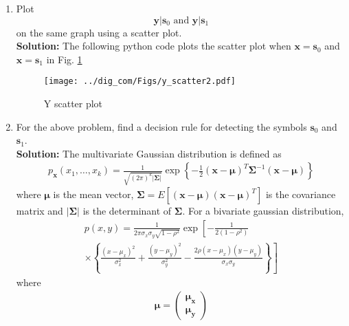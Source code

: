 \documentclass{article}
\numberwithin{equation}{subsection}
\numberwithin{figure}{subsection}
\providecommand{\mbf}{\mathbf}
\providecommand{\cbrak}[1]{\ensuremath{\left\{#1\right\}}}
\providecommand{\brak}[1]{\ensuremath{\left(#1\right)}}
\providecommand{\lsbrak}[1]{\ensuremath{{}\left[#1\right.}}
\providecommand{\rsbrak}[1]{\ensuremath{{}\left.#1\right]}}
\providecommand{\sbrak}[1]{\ensuremath{{}\left[#1\right]}}
\providecommand{\abs}[1]{\left\vert#1\right\vert}
\newcommand{\solution}{\noindent \textbf{Solution: }}
\renewcommand\thesection{\arabic{section}}
\renewcommand\thesubsection{\thesection.\arabic{subsection}}
\begin{document}
\begin{enumerate}[label=\thesubsection.\arabic*,ref=\thesubsection.\arabic{figure}]
\item
\label{ch5_fsk}
Plot 
%
\begin{equation}
\mbf{y}|\mbf{s}_0 \text{ and } \mbf{y}|\mbf{s}_1
\end{equation}
%
on the same graph using a scatter plot.\\
\solution The following python code plots the scatter plot when $\mbf{x} = \mbf{s}_0$ and $\mbf{x} = \mbf{s}_1$ in Fig. \ref{fig:scatter_2}
\begin{center}
\end{center}
\begin{figure}
\centering
\texttt{[image: ../dig\_com/Figs/y\_scatter2.pdf]}     
\caption{Y scatter plot }
\label{fig:scatter_2}
\end{figure}
\item
For the above problem, find a decision rule for detecting the symbols $\mbf{s}_0 $ and $\mbf{s}_1$.\\
\solution The multivariate Gaussian distribution is defined as
    \begin{multline}
    \label{eq:multivariate}
    p_{\mathbf{x}}(x_1,\dots,x_k)
    =\frac{1}{\sqrt{\brak{2\pi}^k\abs{\mbf{\Sigma}}}}\exp\cbrak{-\frac{1}{2}\brak{\mathbf{x}-\mbf{\mu}}^T\mbf{\Sigma}^{-1}\brak{\mathbf{x}-\mbf{\mu}}}
    \end{multline}
    where $\mbf{\mu}$ is the mean vector, $\mbf{\Sigma} = E\sbrak{\brak{\mathbf{x}-\mbf{\mu}}\brak{\mathbf{x}-\mbf{\mu}}^T}$ is the covariance matrix and $\abs{\mbf{\Sigma}}$ is the determinant of $\mbf{\Sigma}$.
    For a bivariate gaussian distribution,
    {\small
    \begin{multline}
    \label{eq:bivariate}
    p(x,y)= \frac{1}{2\pi \sigma_x\sigma_y\sqrt{1-\rho^2}}\exp\lsbrak{-\frac{1}{2\brak{1-\rho^2}}}
    \\
    \times \rsbrak{\cbrak{\frac{\brak{x-\mu_x}^2}{\sigma_x^2}+\frac{\brak{y-\mu_y}^2}{\sigma_y^2}-\frac{2\rho\brak{x-\mu_x}\brak{y-\mu_y}}{\sigma_x\sigma_y}}}
    \end{multline}
    }
    where
    \begin{align}
\mbf{\mu}=\begin{pmatrix}
\mbf{\mu_x} \\
\mbf{\mu_y}

\end{pmatrix}
\end{align}
\end{enumerate}
\end{document}
